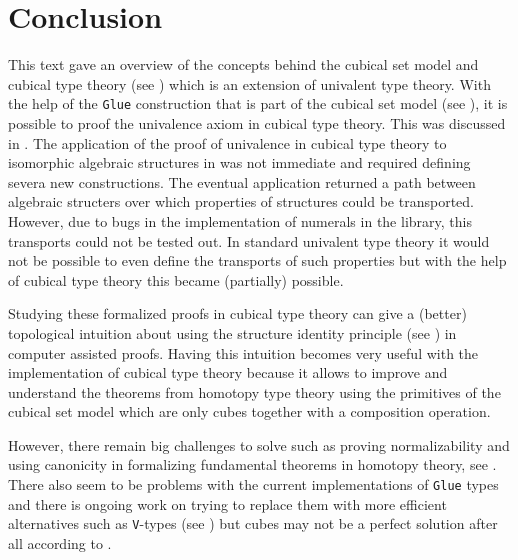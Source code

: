 \documentclass[12pt,a4paper,twoside,xetex]{book} %
\begin{document}
 

 
% 






\chapter*{Conclusion}

This text gave an overview of the concepts behind the cubical 
set model and cubical type theory (see ) which is an extension of univalent type theory. With the help of the \texttt{Glue} construction that is part of the cubical set model (see ), it is possible to proof the univalence axiom in cubical type theory. This was discussed in . The application of the 
proof of univalence in cubical type theory to isomorphic algebraic structures in 
 was not immediate and required defining severa new constructions. The eventual application returned a path between algebraic structers over which  properties of 
structures could be transported. However, due to bugs in the implementation of numerals in the library, this transports could not be tested out. In standard univalent type theory it would not be possible to even define the transports of such properties but with the help of cubical type theory this became (partially) possible. 

Studying these formalized proofs in cubical type 
theory can give a (better) topological intuition about using the structure 
identity principle (see \cite{Aczel2012}) in computer assisted proofs. Having 
this intuition becomes very useful with the implementation of cubical type 
theory because it allows to improve and understand the theorems from homotopy 
type theory using the primitives of the cubical set model which are only
cubes together with a composition operation. 

However, there remain big challenges to solve such as proving normalizability and 
using canonicity in formalizing fundamental theorems in homotopy theory, see 
. There also seem to be problems with 
the current implementations of \texttt{Glue} types and there is ongoing work on 
trying to replace them with more efficient alternatives such as 
\texttt{V}-types (see ) but cubes may not be a perfect solution after all
according to \cite{Cubicalv92:online}.
\end{document}
